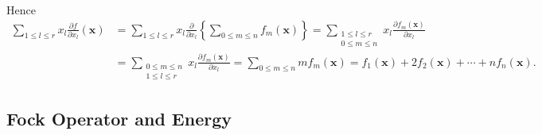 \documentclass[aps,preprint]{revtex4}%
\begin{document}
Hence%
\begin{align}%
{\textstyle\sum\limits_{1\leq l\leq r}}
x_{l}\frac{\partial f}{\partial x_{l}}\left(  \bm{x}\right)   &  =%
{\textstyle\sum\limits_{1\leq l\leq r}}
x_{l}\frac{\partial}{\partial x_{l}}\left\{
{\textstyle\sum\limits_{0\leq m\leq n}}
f_{m}\left(  \bm{x}\right)  \right\}  =%
{\textstyle\sum\limits_{\substack{1\leq l\leq r\\0\leq m\leq n}}}
x_{l}\frac{\partial f_{m}\left(  \bm{x}\right)  }{\partial x_{l}}\nonumber\\
&  =%
{\textstyle\sum\limits_{\substack{0\leq m\leq n\\1\leq l\leq r}}}
x_{l}\frac{\partial f_{m}\left(  \bm{x}\right)  }{\partial x_{l}}=%
{\textstyle\sum\limits_{0\leq m\leq n}}
mf_{m}\left(  \bm{x}\right)  =f_{1}\left(  \bm{x}\right)  +2f_{2}\left(
\bm{x}\right)  +\cdots+nf_{n}\left(  \bm{x}\right)  . \label{homex}%
\end{align}


\subsection{Fock Operator and Energy\label{Fock&En}}
\end{document}
